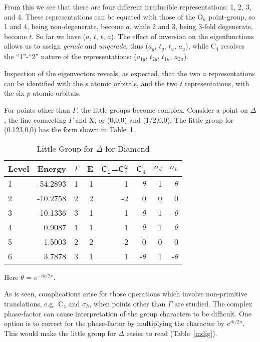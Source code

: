 From this we see that there are four different irreducible representations: 1,
2, 3, and 4. These representations can be equated with those of the O$_h$
point-group, so 1 and 4, being non-degenerate, become $a$, while 2 and 3, being
3-fold degenerate, become $t$. So far we have ($a$, $t$, $t$, $a$).  The effect
of inversion on the eigenfunctions allows us to assign {\em gerade} and  {\em
ungerade}, thus ($a_g$, $t_g$, $t_u$, $a_u$), while C$_4$ resolves the
``1''-``2'' nature of the representations: ($a_{1g}$, $t_{2g}$, $t_{1u}$,
$a_{2u}$).

Inspection of the eigenvectors reveals, as expected, that the two
$a$ representations can be identified with the $s$ atomic orbitals, and the two
$t$ representations, with the six $p$ atomic orbitals.

For points other than $\Gamma$, the little groups become complex. Consider a
point on $\Delta$, the line connecting $\Gamma$ and X, or (0,0,0) and
(1/2,0,0). The little group for (0.123,0,0) has the form shown in
Table~\ref{dig}.
\begin{table}
\begin{center}
\caption{\label{dig} Little Group for $\Delta$ for Diamond}
\begin{tabular}{lrlrrrrr} \\ \hline
Level&Energy&$\Gamma$&E &C$_2$=C$_4^2$ &C$_4$&$\sigma_d$
&$\sigma_h$  \\  \hline
  1& -54.2893 &1 & 1& 1& $\theta$    &   1& $\theta$   \\
  2& -10.2758 &2 & 2&-2& 0           &   0& 0              \\
  3& -10.1336 &3 & 1& 1&-$\theta$    &   1& -$\theta$   \\
  4&   0.9087 &1 & 1& 1& $\theta$    &   1& $\theta$   \\
  5&   1.5003 &2 & 2&-2& 0           &   0& 0  \\
  6&   3.7878 &3 & 1& 1&-$\theta$    &   1& -$\theta$  \\ \hline
\end{tabular}\end{center}\end{table}
Here $\theta$ = $e^{-ik/2\pi}$.


As is seen, complications arise for those operations which involve
 non-primitive
translations,  e.g.\  C$_{4}$ and $\sigma_h$, when points other than $\Gamma$ are
studied. The complex phase-factor can cause interpretation of the group
characters to be difficult.  One option is to correct for the phase-factor by
multiplying the character by $e^{ik/2\pi}$. This would make the little group
for $\Delta$ easier to read (Table~\ref{mdig}).

